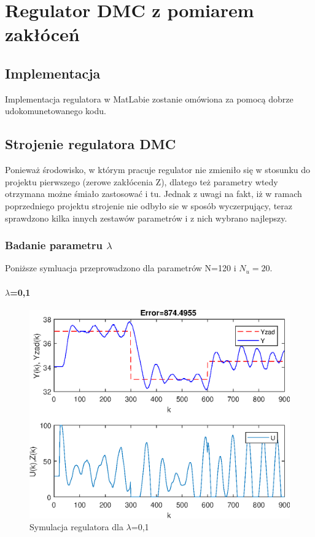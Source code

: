 \chapter{Regulator DMC z pomiarem zakłóceń}

\section{Implementacja}

Implementacja regulatora w MatLabie zostanie omówiona za pomocą dobrze udokomunetowanego kodu.

\section {Strojenie regulatora DMC}

Ponieważ środowisko, w którym pracuje regulator nie zmieniło się w stosunku do projektu pierwszego (zerowe zakłócenia Z), dlatego też parametry wtedy otrzymana możne śmiało zastosować i tu. Jednak z uwagi na fakt, iż w ramach poprzedniego projektu strojenie nie odbyło sie w sposób wyczerpujący, teraz sprawdzono kilka innych zestawów parametrów i z nich wybrano najlepszy.\\

\subsection {Badanie parametru $\lambda$}

Poniższe symluacja przeprowadzono dla parametrów N=120 i $N_{u}=20$.\\

\subsubsection{$\lambda$=0,1}

\begin{figure}[h!]
	\centering
	\includegraphics[scale=1]{Rys/N=120Nu=20lambda=0.1.eps}
	\caption{Symulacja regulatora dla $\lambda$=0,1}
	\label{lambda1}
\end{figure}
\FloatBarrier
